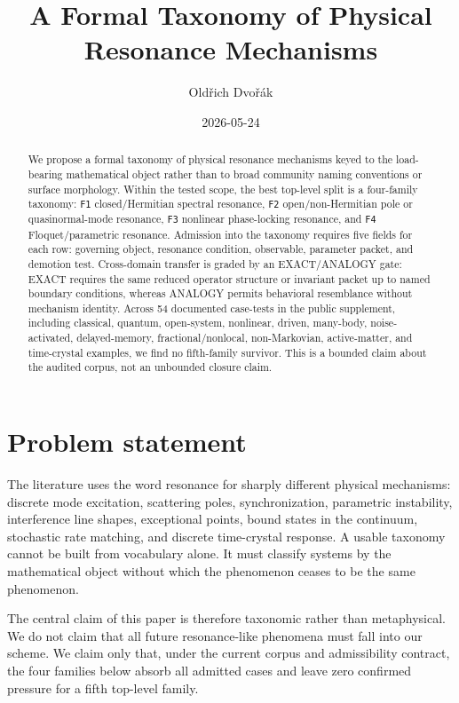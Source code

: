 \documentclass[aps,pra,reprint,nofootinbib]{revtex4-2}
\begin{document}
\title{A Formal Taxonomy of Physical Resonance Mechanisms}
\author{Old\v{r}ich Dvo\v{r}\'ak}
\date{2026-05-24}

\begin{abstract}
We propose a formal taxonomy of physical resonance mechanisms keyed to the load-bearing mathematical object rather than to broad community naming conventions or surface morphology. Within the tested scope, the best top-level split is a four-family taxonomy: \texttt{F1} closed/Hermitian spectral resonance, \texttt{F2} open/non-Hermitian pole or quasinormal-mode resonance, \texttt{F3} nonlinear phase-locking resonance, and \texttt{F4} Floquet/parametric resonance. Admission into the taxonomy requires five fields for each row: governing object, resonance condition, observable, parameter packet, and demotion test. Cross-domain transfer is graded by an EXACT/ANALOGY gate: EXACT requires the same reduced operator structure or invariant packet up to named boundary conditions, whereas ANALOGY permits behavioral resemblance without mechanism identity. Across 54 documented case-tests in the public supplement, including classical, quantum, open-system, nonlinear, driven, many-body, noise-activated, delayed-memory, fractional/nonlocal, non-Markovian, active-matter, and time-crystal examples, we find no fifth-family survivor. This is a bounded claim about the audited corpus, not an unbounded closure claim.
\end{abstract}

\maketitle

\section{Problem statement}

The literature uses the word resonance for sharply different physical mechanisms: discrete mode excitation, scattering poles, synchronization, parametric instability, interference line shapes, exceptional points, bound states in the continuum, stochastic rate matching, and discrete time-crystal response. A usable taxonomy cannot be built from vocabulary alone. It must classify systems by the mathematical object without which the phenomenon ceases to be the same phenomenon.

The central claim of this paper is therefore taxonomic rather than metaphysical. We do not claim that all future resonance-like phenomena must fall into our scheme. We claim only that, under the current corpus and admissibility contract, the four families below absorb all admitted cases and leave zero confirmed pressure for a fifth top-level family.
\end{document}
